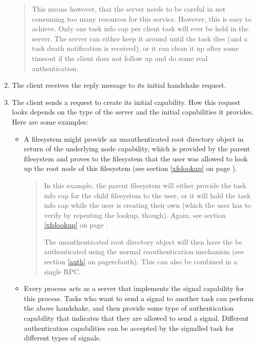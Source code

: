 \documentclass[9pt,a4paper]{extarticle}
\newenvironment{comment}{\footnotesize \begin{quote}}{\end{quote}}
\begin{document}
\begin{enumerate}
\begin{comment}
  This means however, that the server needs to be careful in not
  consuming too many resources for this service.  However, this is
  easy to achieve.  Only one task info cap per client task will ever
  be held in the server.  The server can either keep it around until
  the task dies (and a task death notification is received), or it can
  clean it up after some timeout if the client does not follow up and
  do some real authentication.
\end{comment}

\item The client receives the reply message to its initial handshake
  request.
  
\item The client sends a request to create its initial capability.
  How this request looks depends on the type of the server and the
  initial capabilities it provides.  Here are some examples:

  \begin{itemize}
  \item A filesystem might provide an unauthenticated root directory
    object in return of the underlying node capability, which is
    provided by the parent filesystem and proves to the filesystem
    that the user was allowed to look up the root node of this
    filesystem (see section \ref{xfslookup} on page
    \pageref{xfslookup}).

    \begin{comment}
      In this example, the parent filesystem will either provide the
      task info cap for the child filesystem to the user, or it will
      hold the task info cap while the user is creating their own
      (which the user has to verify by repeating the lookup, though).
      Again, see section \ref{xfslookup} on page \pageref{xfslookup}.
      
      The unauthenticated root directory object will then have the be
      authenticated using the normal reauthentication mechanism (see
      section \ref{auth} on pageref{auth}).  This can also be combined
      in a single RPC.
    \end{comment}
    
  \item Every process acts as a server that implements the signal
    capability for this process.  Tasks who want to send a signal to
    another task can perform the above handshake, and then provide
    some type of authentication capability that indicates that they
    are allowed to send a signal.  Different authentication
    capabilities can be accepted by the signalled task for different
    types of signals.


\end{itemize}
\end{enumerate}
\end{document}
